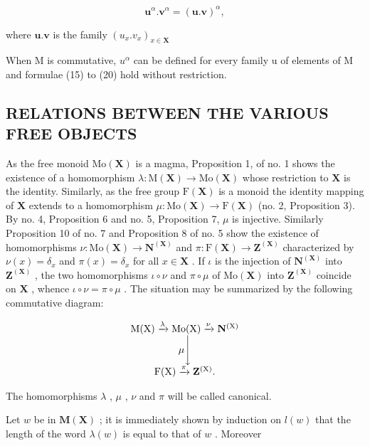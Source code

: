 \[
\mathbf {u} ^ {\alpha}. \mathbf {v} ^ {\alpha} = (\mathbf {u}. \mathbf {v}) ^ {\alpha},\tag{20}
\]

where \(\mathbf{u}.\mathbf{v}\) is the family \((u_x.v_x)_{x\in \mathbf{X}}\)

When M is commutative, \(u^{\alpha}\) can be defined for every family u of elements of M and formulae (15) to (20) hold without restriction.

\subsection{RELATIONS BETWEEN THE VARIOUS FREE OBJECTS}

As the free monoid \(\mathrm{Mo}(\mathbf{X})\) is a magma, Proposition 1, of no. 1 shows the existence of a homomorphism \(\lambda: \mathrm{M}(\mathbf{X}) \to \mathrm{Mo}(\mathbf{X})\) whose restriction to \(\mathbf{X}\) is the identity. Similarly, as the free group \(\mathrm{F}(\mathbf{X})\) is a monoid the identity mapping of \(\mathbf{X}\) extends to a homomorphism \(\mu: \mathrm{Mo}(\mathbf{X}) \to \mathrm{F}(\mathbf{X})\) (no. 2, Proposition 3). By no. 4, Proposition 6 and no. 5, Proposition 7, \(\mu\) is injective. Similarly Proposition 10 of no. 7 and Proposition 8 of no. 5 show the existence of homomorphisms \(\nu: \mathrm{Mo}(\mathbf{X}) \to \mathbf{N}^{(\mathbf{X})}\) and \(\pi: \mathrm{F}(\mathbf{X}) \to \mathbf{Z}^{(\mathbf{X})}\) characterized by \(\nu(x) = \delta_x\) and \(\pi(x) = \delta_x\) for all \(x \in \mathbf{X}\) . If \(\iota\) is the injection of \(\mathbf{N}^{(\mathbf{X})}\) into \(\mathbf{Z}^{(\mathbf{X})}\) , the two homomorphisms \(\iota \circ \nu\) and \(\pi \circ \mu\) of \(\mathrm{Mo}(\mathbf{X})\) into \(\mathbf{Z}^{(\mathbf{X})}\) coincide on \(\mathbf{X}\) , whence \(\iota \circ \nu = \pi \circ \mu\) . The situation may be summarized by the following commutative diagram:

\[
\begin{array}{c} \mathrm{M} (\mathrm{X}) \xrightarrow {\lambda} \mathrm{Mo} (\mathrm{X}) \xrightarrow {\nu} \mathbf {N} ^ {(\mathrm{X})} \\ \mu \Biggl \downarrow \\ \mathrm{F} (\mathrm{X}) \xrightarrow {\pi} \mathbf {Z} ^ {(\mathrm{X})}. \end{array}
\]

The homomorphisms \(\lambda\) , \(\mu\) , \(\nu\) and \(\pi\) will be called canonical.

Let \(w\) be in \(\mathbf{M}(\mathbf{X})\) ; it is immediately shown by induction on \(l(w)\) that the length of the word \(\lambda(w)\) is equal to that of \(w\) . Moreover

